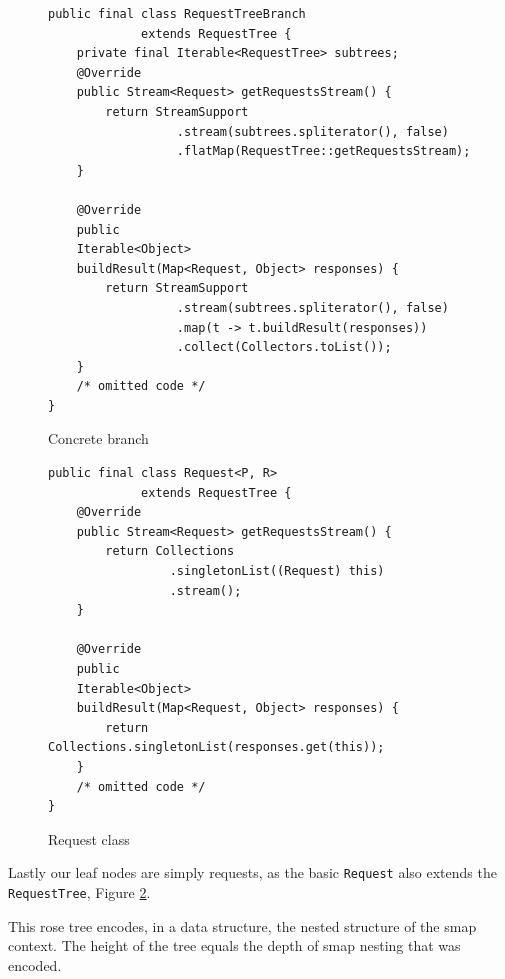 \begin{figure}

\begin{verbatim}
public final class RequestTreeBranch
             extends RequestTree {
    private final Iterable<RequestTree> subtrees;
    @Override
    public Stream<Request> getRequestsStream() {
        return StreamSupport
                  .stream(subtrees.spliterator(), false)
                  .flatMap(RequestTree::getRequestsStream);
    }

    @Override
    public
    Iterable<Object>
    buildResult(Map<Request, Object> responses) {
        return StreamSupport
                  .stream(subtrees.spliterator(), false)
                  .map(t -> t.buildResult(responses))
                  .collect(Collectors.toList());
    }
    /* omitted code */
}
\end{verbatim}
\caption{Concrete branch}
\label{fig:tree-impl-branch}

\end{figure}
\begin{figure}

\begin{verbatim}
public final class Request<P, R>
             extends RequestTree {
    @Override
    public Stream<Request> getRequestsStream() {
        return Collections
                 .singletonList((Request) this)
                 .stream();
    }

    @Override
    public
    Iterable<Object>
    buildResult(Map<Request, Object> responses) {
        return Collections.singletonList(responses.get(this));
    }
    /* omitted code */
}
\end{verbatim}

\caption{Request class}
\label{fig:tree-impl-request-class}
\end{figure}

Lastly our leaf nodes are simply requests, as the basic \texttt{Request} also extends the \texttt{RequestTree}, Figure \ref{fig:tree-impl-request-class}.

This rose tree encodes, in a data structure, the nested structure of the smap context.
The height of the tree equals the depth of smap nesting that was encoded.

